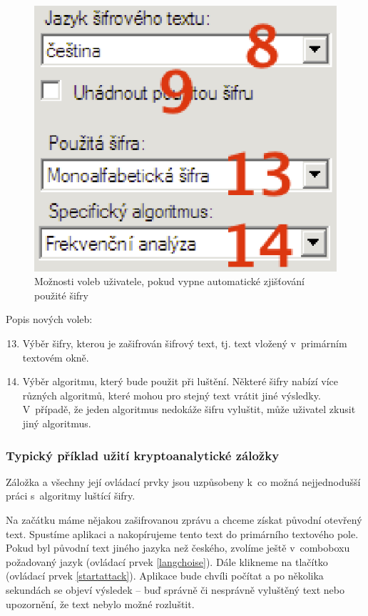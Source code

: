 \documentclass[12pt]{article}
\theoremstyle{definition}
\begin{document}
\begin{figure}[h]
  \begin{center}
  \includegraphics[scale=0.8]{images/cryptchoise.eps}
  \end{center}
\caption{Možnosti voleb uživatele, pokud vypne automatické zjišťování použité šifry}
\label{img_usercheck}
\end{figure}

Popis nových voleb:

\begin{enumerate}
\setcounter{enumi}{12}
\item Výběr šifry, kterou je zašifrován šifrový text, tj. text vložený v~primárním textovém okně. 
\item Výběr algoritmu, který bude použit při luštění. Některé šifry nabízí více různých algoritmů, které mohou pro stejný text vrátit jiné výsledky. V~případě, že jeden algoritmus nedokáže šifru vyluštit, může uživatel zkusit jiný algoritmus.
\end{enumerate}

\subsubsection{Typický příklad užití kryptoanalytické záložky}
Záložka a všechny její ovládací prvky jsou uzpůsobeny k~co možná nejjednodušší práci s~algoritmy luštící šifry. 

Na začátku máme nějakou zašifrovanou zprávu a chceme získat původní otevřený text. Spustíme aplikaci a nakopírujeme tento text do primárního textového pole. Pokud byl původní text jiného jazyka než českého, zvolíme ještě v~comboboxu požadovaný jazyk (ovládací prvek \ref{langchoise}). Dále klikneme na tlačítko  (ovládací prvek \ref{startattack}). Aplikace bude chvíli počítat a po několika sekundách se objeví výsledek -- buď správně či nesprávně vyluštěný text nebo upozornění, že text nebylo možné rozluštit. 
\end{document}
